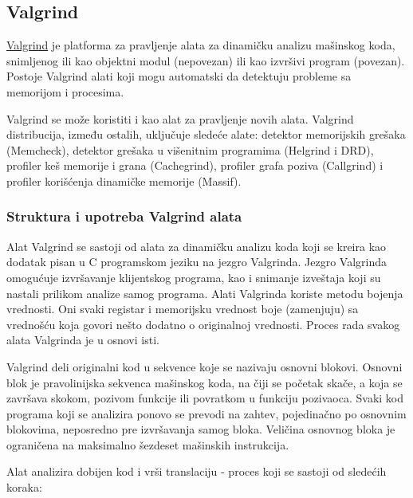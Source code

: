 \subsection{Valgrind}\label{valgrind}

\href{https://valgrind.org/}{Valgrind} je platforma za pravljenje alata za dinamičku analizu mašinskog koda, snimljenog ili kao objektni modul (nepovezan) ili kao izvršivi program (povezan). Postoje Valgrind alati koji mogu automatski da detektuju probleme sa memorijom i procesima.

Valgrind se može koristiti i kao alat za pravljenje novih alata. Valgrind distribucija, između ostalih, uključuje sledeće alate: detektor memorijskih grešaka (Memcheck), detektor grešaka u višenitnim programima (Helgrind i DRD), profiler keš memorije i grana (Cachegrind), profiler grafa poziva (Callgrind) i profiler korišćenja dinamičke memorije (Massif).

\subsubsection{Struktura i upotreba Valgrind alata}\label{struktura-i-upotreba-valgrind-alata}

Alat Valgrind se sastoji od alata za dinamičku analizu koda koji se kreira kao dodatak pisan u C programskom jeziku na jezgro Valgrinda. Jezgro Valgrinda omogućuje izvršavanje klijentskog programa, kao i snimanje izveštaja koji su nastali prilikom analize samog programa. Alati Valgrinda koriste metodu bojenja vrednosti. Oni svaki registar i memorijsku vrednost boje (zamenjuju) sa vrednošću koja govori nešto dodatno o originalnoj vrednosti. Proces rada svakog alata Valgrinda je u osnovi isti.

Valgrind deli originalni kod u sekvence koje se nazivaju osnovni blokovi. Osnovni blok je pravolinijska sekvenca mašinskog koda, na čiji se početak skače, a koja se završava skokom, pozivom funkcije ili povratkom u funkciju pozivaoca. Svaki kod programa koji se analizira ponovo se prevodi na zahtev, pojedinačno po osnovnim blokovima, neposredno pre izvršavanja samog bloka. Veličina osnovnog bloka je ograničena na maksimalno šezdeset mašinskih instrukcija.

Alat analizira dobijen kod i vrši translaciju - proces koji se sastoji od sledećih koraka:

